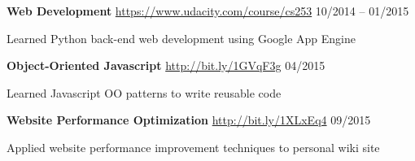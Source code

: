 \documentclass[margin,line]{resume}
\begin{document}
\begin{resume}
    \textbf{Web Development} \url{https://www.udacity.com/course/cs253} \hfill 10/2014 -- 01/2015 \vspace{-3mm}\\\vspace{-1mm}%
      \begin{list2}
       \item Learned Python back-end web development using Google App Engine
      \end{list2}
    \vspace{-2mm}
    \textbf{Object-Oriented Javascript} \url{http://bit.ly/1GVqF3g} \hfill 04/2015 \vspace{-3mm}\\\vspace{-1mm}%
      \begin{list2}
       \item Learned Javascript OO patterns to write reusable code
      \end{list2}
    \textbf{Website Performance Optimization} \url{http://bit.ly/1XLxEq4} \hfill 09/2015 \vspace{-3mm}\\\vspace{-1mm}%
      \begin{list2}
       \item Applied website performance improvement techniques to personal wiki site
      \end{list2}
    \vspace{-2mm}


\end{resume}
\end{document}
